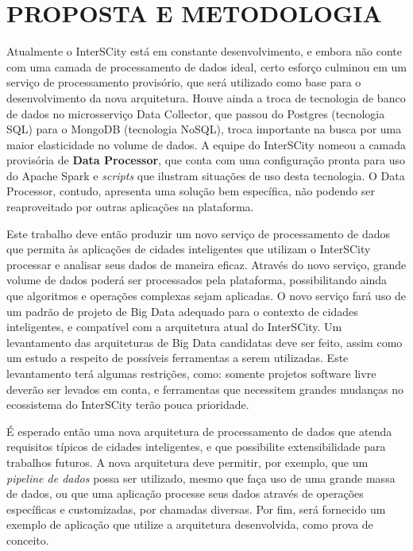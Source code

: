 \section{PROPOSTA E METODOLOGIA}

Atualmente o InterSCity está em constante desenvolvimento, e embora não conte
com uma camada de processamento de dados ideal, certo esforço culminou em um
serviço de processamento provisório, que será utilizado como base para o
desenvolvimento da nova arquitetura. Houve ainda a troca de tecnologia de banco
de dados no microsserviço Data Collector, que passou do Postgres (tecnologia
SQL) para o MongoDB (tecnologia NoSQL), troca importante na busca por uma maior
elasticidade no volume de dados. A equipe do InterSCity nomeou a camada
provisória de \textbf{Data Processor}, que conta com uma configuração pronta
para uso do Apache Spark e \textit{scripts} que ilustram situações de uso desta
tecnologia. O Data Processor, contudo, apresenta uma solução bem específica,
não podendo ser reaproveitado por outras aplicações na plataforma.

Este trabalho deve então produzir um novo serviço de processamento de dados que
permita às aplicações de cidades inteligentes que utilizam o InterSCity
processar e analisar seus dados de maneira eficaz. Através do novo serviço,
grande volume de dados poderá ser processados pela plataforma, possibilitando
ainda que algoritmos e operações complexas sejam aplicadas. O novo serviço fará
uso de um padrão de projeto de Big Data adequado para o contexto de cidades
inteligentes, e compatível com a arquitetura atual do InterSCity. Um
levantamento das arquiteturas de Big Data candidatas deve ser feito, assim
como um estudo a respeito de possíveis ferramentas a serem utilizadas. Este
levantamento terá algumas restrições, como: somente projetos software livre
deverão ser levados em conta, e ferramentas que necessitem grandes mudanças no
ecossistema do InterSCity terão pouca prioridade.

É esperado então uma nova arquitetura de processamento de dados que atenda
requisitos típicos de cidades inteligentes, e que possibilite extensibilidade
para trabalhos futuros. A nova arquitetura deve permitir, por exemplo, que um
\textit{pipeline de dados} possa ser utilizado, mesmo que faça uso de uma
grande massa de dados, ou que uma aplicação processe seus dados através de
operações específicas e customizadas, por chamadas diversas. Por fim, será
fornecido um exemplo de aplicação que utilize a arquitetura desenvolvida, como
prova de conceito.
